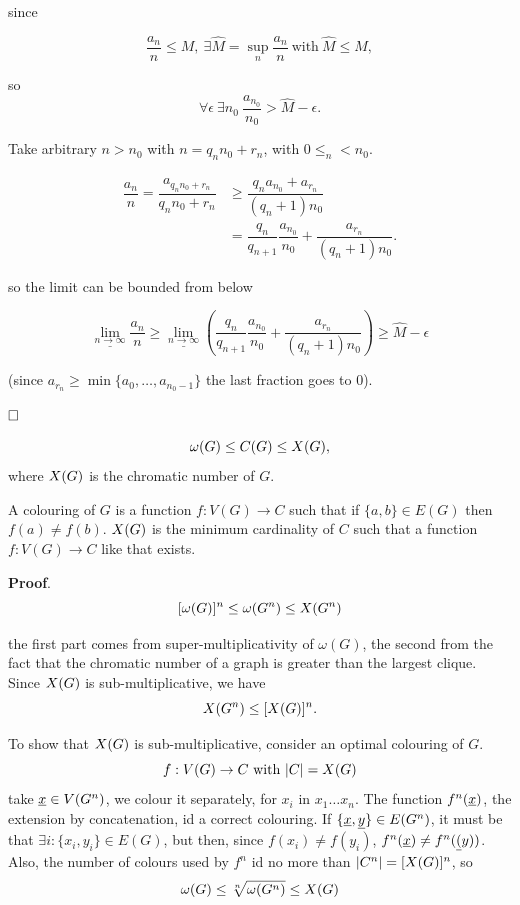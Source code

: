 since 

\[
 \dfrac{a_n}{n} \leq M,\ \exists \hat{M} = \sup_n \dfrac{a_n}{n}\ \text{with}\ \hat{M} \leq M,
\]

so
\[
 \forall \epsilon\ \exists n_0\ \dfrac{a_{n_0}}{n_0} > \hat{M} - \epsilon.  
\]

Take arbitrary $n > n_0$ with $n = q_nn_0 +r_n$, with $0 \leq _n < n_0$.

\begin{align*}
 \dfrac{a_n}{n} = \dfrac{a_{q_nn_0 +r_n}}{q_nn_0 +r_n} & \geq \dfrac{q_na_{n_0} +a_{r_n}}{(q_n+1)n_0}\\
 & = \dfrac{q_n}{q_{n+1}} \dfrac{a_{n_0}}{n_0} + \dfrac{a_{r_n}}{(q_n + 1)n_0}.
\end{align*}

so the limit can be bounded from below

\[
 \underline{\lim_{n\rightarrow \infty}} \dfrac{a_n}{n} \geq \underline{\lim_{n\rightarrow \infty}}\left(\dfrac{q_n}{q_{n+1}} \dfrac{a_{n_0}}{n_0} + \dfrac{a_{r_n}}{(q_n + 1)n_0}\right) \geq \hat{M} - \epsilon
\]

(since $a_{r_n} \geq \min\{a_0, \ldots,a_{n_0 -1}\}$ the last fraction goes to 0).

$\hfill\Box$

\begin{prop}
 $$\omega(G) \leq C(G) \leq X(G),$$ where $X(G)$ is the chromatic number of $G$.
\end{prop}

A colouring of $G$ is a function $f: V(G) \rightarrow C$ such that if $\{a, b\} \in E(G)$ then $f(a) \not= f(b)$. $X(G)$ is the minimum cardinality of $C$ such that a function $f: V(G) \rightarrow C$ like that exists.

\noindent\textbf{Proof}. 
\[
 [\omega(G)]^n \leq \omega(G^n) \leq X(G^n)
\]

the first part comes from super-multiplicativity of $\omega(G)$, the second from the fact that the chromatic number of a graph is greater than the largest clique. Since $X(G)$ is sub-multiplicative, we have $$X(G^n) \leq [X(G)]^n.$$

To show that $X(G)$ is sub-multiplicative, consider an optimal colouring of $G$. $$f:V(G) \rightarrow C\ \text{with}\ |C| = X(G)$$ take $\underline{x} \in V(G^n)$, we colour it separately, for $x_i$ in $x_1\ldots x_n$. The function $f^n(\underline{x})$, the extension by concatenation, id a correct colouring. If $\{\underline{x}, \underline{y}\} \in E(G^n)$, it must be that $\exists i : \{x_i, y_i\} \in E(G)$, but then, since $f(x_i) \not=f(y_i)$, $f^n(\underline{x}) \not= f^n(\underline{(}y))$. Also, the number of colours used by $f^n$ id no more than $|C^n| = [X(G)]^n$, so
\[
 \omega(G) \leq \sqrt[n]{\omega(G^n)} \leq X(G)
\]

